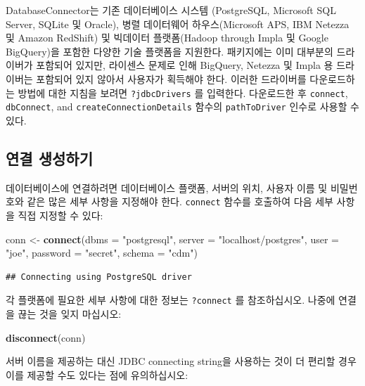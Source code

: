 \documentclass[11pt]{book}
\newenvironment{Shaded}{\begin{snugshade}}{\end{snugshade}}
\newcommand{\KeywordTok}[1]{\textcolor[rgb]{0.13,0.29,0.53}{\textbf{#1}}}
\newcommand{\DataTypeTok}[1]{\textcolor[rgb]{0.13,0.29,0.53}{#1}}
\newcommand{\StringTok}[1]{\textcolor[rgb]{0.31,0.60,0.02}{#1}}
\newcommand{\NormalTok}[1]{#1}
\theoremstyle{definition}
\theoremstyle{definition}
\theoremstyle{definition}
\theoremstyle{remark}
\begin{document}
DatabaseConnector는 기존 데이터베이스 시스템 (PostgreSQL, Microsoft SQL
Server, SQLite 및 Oracle), 병렬 데이터웨어 하우스(Microsoft APS, IBM
Netezza 및 Amazon RedShift) 및 빅데이터 플랫폼(Hadoop through Impla 및
Google BigQuery)을 포함한 다양한 기술 플랫폼을 지원한다. 패키지에는 이미
대부분의 드라이버가 포함되어 있지만, 라이센스 문제로 인해 BigQuery,
Netezza 및 Impla 용 드라이버는 포함되어 있지 않아서 사용자가 획득해야
한다. 이러한 드라이버를 다운로드하는 방법에 대한 지침을 보려면
\texttt{?jdbcDrivers} 를 입력한다. 다운로드한 후 \texttt{connect},
\texttt{dbConnect}, and \texttt{createConnectionDetails} 함수의
\texttt{pathToDriver} 인수로 사용할 수 있다.

\subsection{연결 생성하기}\label{-}

데이터베이스에 연결하려면 데이터베이스 플랫폼, 서버의 위치, 사용자 이름
및 비밀번호와 같은 많은 세부 사항을 지정해야 한다. \texttt{connect}
함수를 호출하여 다음 세부 사항을 직접 지정할 수 있다:

\begin{Shaded}
\begin{Highlighting}[]
\NormalTok{conn <-}\StringTok{ }\KeywordTok{connect}\NormalTok{(}\DataTypeTok{dbms =} \StringTok{"postgresql"}\NormalTok{,}
                \DataTypeTok{server =} \StringTok{"localhost/postgres"}\NormalTok{,}
                \DataTypeTok{user =} \StringTok{"joe"}\NormalTok{,}
                \DataTypeTok{password =} \StringTok{"secret"}\NormalTok{,}
                \DataTypeTok{schema =} \StringTok{"cdm"}\NormalTok{)}
\end{Highlighting}
\end{Shaded}

\begin{verbatim}
## Connecting using PostgreSQL driver
\end{verbatim}

각 플랫폼에 필요한 세부 사항에 대한 정보는 \texttt{?connect} 를
참조하십시오. 나중에 연결을 끊는 것을 잊지 마십시오:

\begin{Shaded}
\begin{Highlighting}[]
\KeywordTok{disconnect}\NormalTok{(conn)}
\end{Highlighting}
\end{Shaded}

서버 이름을 제공하는 대신 JDBC connecting string을 사용하는 것이 더
편리할 경우 이를 제공할 수도 있다는 점에 유의하십시오:
\end{document}
